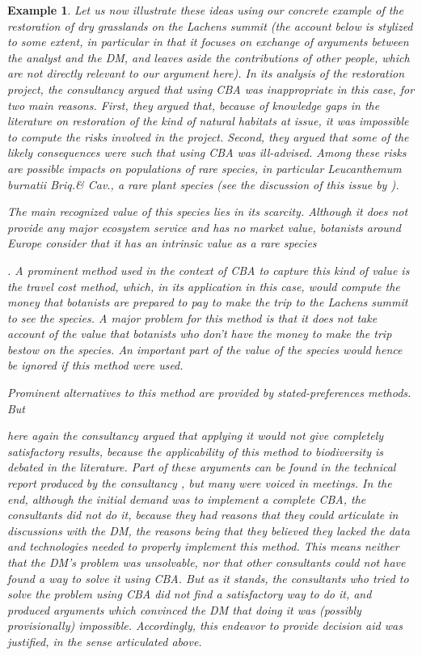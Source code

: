 \documentclass[preprint, french, english, 11pt, authoryear]{elsarticle}%
\newtheorem{example}{Example}
\begin{document}
\begin{example}
Let us now illustrate these ideas using our concrete example of the restoration of dry grasslands on the Lachens summit 
(the account below is stylized to some extent, in particular in that it focuses on exchange of arguments between the analyst and the \ac{DM}, and leaves aside the contributions of other people, which are not directly relevant to our argument here). 
In its analysis of the restoration project, the consultancy argued that using \ac{CBA} was inappropriate in this case, for two main reasons. 
First, they argued that, because of knowledge gaps in the literature on restoration of the kind of natural habitats at issue, it was impossible to compute the risks involved in the project. 
Second, they argued that some of the likely consequences were such that using \ac{CBA} was ill-advised.
 Among these risks are possible impacts on populations of rare species, in particular \emph{Leucanthemum burnatii} Briq.\@ \& Cav.\@, a rare plant species (see the discussion of this issue by \citet{meinard_ethical_2016}).
\begin{changebar}The main recognized value of this species lies in its scarcity. Although it does not provide any major ecosystem service and has no market value, botanists around Europe consider that it has an intrinsic value as a rare species\end{changebar}.
A prominent method used in the context of \ac{CBA} to capture this kind of value is the travel cost method, which, in its application in this case, would compute the money that botanists are prepared to pay to make the trip to the Lachens summit to see the species.
A major problem for this method is that it does not take account of the value that botanists who don't have the money to make the trip bestow on the species. An important part of the value of the species would hence be ignored if this method were used.
\begin{changebar}Prominent alternatives to this method are provided by stated-preferences methods. But\end{changebar} here again the consultancy argued that applying it would not give completely satisfactory results, because the applicability of this method to biodiversity is debated in the literature.
Part of these arguments can be found in the technical report produced by the consultancy \citep{meinard_etude_2015}, but many were voiced in meetings.
In the end, although the initial demand was to implement a complete \ac{CBA}, the consultants did not do it, because they had reasons that they could articulate in discussions with the \ac{DM}, the reasons being that they believed they lacked the data and technologies needed to properly implement this method. 
This means neither that the \ac{DM}'s problem was unsolvable, nor that other consultants could not have found a way to solve it using \ac{CBA}.
But as it stands, the consultants who tried to solve the problem using \ac{CBA} did not find a satisfactory way to do it, and produced arguments which convinced the \ac{DM} that doing it was (possibly provisionally) impossible.
Accordingly, this endeavor to provide decision aid was justified, in the sense articulated above.
\end{example}
\end{document}
